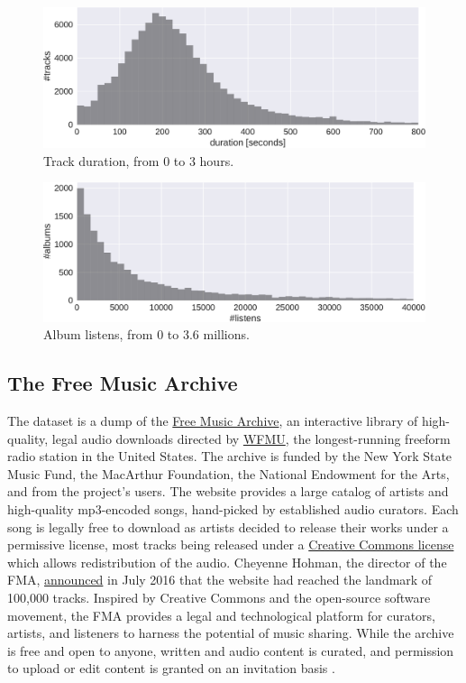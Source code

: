 \documentclass{article}
\begin{document}
\begin{figure}
	\centering
	\includegraphics[width=\linewidth]{duration_distribution.pdf}
	\caption{Track duration, from 0 to 3 hours.}
	\label{fig:duration_distribution}
\end{figure}

\begin{figure}
	\centering
	\includegraphics[width=\linewidth]{listens_distribution.pdf}
	\caption{Album listens, from 0 to 3.6 millions.}
	\label{fig:listens_distribution}
\end{figure}

\subsection{The Free Music Archive}

The dataset is a dump of the \href{https://freemusicarchive.org/}{Free Music Archive}, an interactive library of high-quality, legal audio downloads directed by \href{https://wfmu.org/}{WFMU}, the longest-running freeform radio station in the United States.
The archive is funded by the New York State Music Fund, the MacArthur Foundation, the National Endowment for the Arts, and from the project's users.
The website provides a large catalog of artists and high-quality mp3-encoded songs, hand-picked by established audio curators. Each song is legally free to download as artists decided to release their works under a permissive license, most tracks being released under a \href{https://creativecommons.org/}{Creative Commons license} which allows redistribution of the audio. Cheyenne Hohman, the director of the FMA, \href{http://freemusicarchive.org/member/cheyenne_h/blog/100000_SONGS}{announced} in July 2016 that the website had reached the landmark of 100,000 tracks.
Inspired by Creative Commons and the open-source software movement, the FMA provides a legal and technological platform for curators, artists, and listeners to harness the potential of music sharing. While the archive is free and open to anyone, written and audio content is curated, and permission to upload or edit content is granted on an invitation basis \cite{art:MossFMA}.
\end{document}
